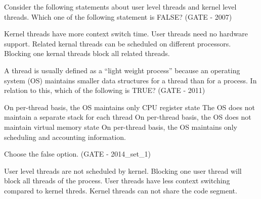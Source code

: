 

\begin{questyle}

  \question Consider the following statements about user level threads and kernel level threads.
            Which one of the following statement is FALSE? (GATE -  2007)

  \begin{choices}
    \choice Kernel threads have more context switch time.
    \choice User threads need no hardware support.
    \choice Related kernal threads can be scheduled on different processors.
    \CorrectChoice Blocking one kernal threads block all related threads.
  \end{choices}


  \end{questyle}





\begin{questyle}

  \question  A thread is usually defined as a “light weight process” because an operating system (OS)
            maintains smaller data structures for a thread than for a process. In relation to this, which
            of the following is TRUE? (GATE - 2011)

  \begin{choices}
    \choice On per-thread basis, the OS maintains only CPU register state
    \choice The OS does not maintain a separate stack for each thread
    \CorrectChoice On per-thread basis, the OS does not maintain virtual memory state
    \choice On per-thread basis, the OS maintains only scheduling and accounting information.
  \end{choices}


  \end{questyle}





\begin{questyle}

  \question  Choose the false option. (GATE - 2014\_set\_1)

  \begin{choices}
    \choice User level threads are not scheduled by kernel.
    \choice Blocking one user thread will block all threads of the process.
    \choice User threads have less context switching compared to kernel threds.
    \CorrectChoice Kernel threads can not share the code segment.
  \end{choices}


  \end{questyle}

